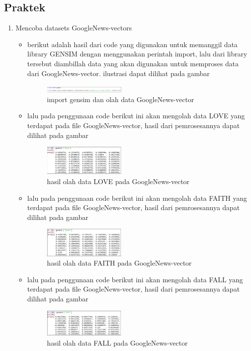 \subsection{Praktek}
\begin{enumerate}
\item Mencoba datasets GoogleNews-vectors
\begin{itemize}
\item berikut adalah hasil dari code yang digunakan untuk memanggil data library GENSIM dengan menggunakan perintah import, lalu dari library tersebut diambillah data yang akan digunakan untuk memproses data dari GoogleNews-vector. ilustrasi dapat dilihat pada gambar
\begin{figure}[H]
\includegraphics[width=4cm]{figures/1174002/chapter5/p1.png}
\centering
\caption{import gensim dan olah data GoogleNews-vector}
\end{figure}

\item lalu pada penggunaan code berikut ini akan mengolah data LOVE yang terdapat pada file GoogleNews-vector, hasil dari pemrosesannya dapat dilihat pada gambar
\begin{figure}[H]
\includegraphics[width=4cm]{figures/1174002/chapter5/p2.png}
\centering
\caption{hasil olah data LOVE pada GoogleNews-vector}
\end{figure}

\item lalu pada penggunaan code berikut ini akan mengolah data FAITH yang terdapat pada file GoogleNews-vector, hasil dari pemrosesannya dapat dilihat pada gambar
\begin{figure}[H]
\includegraphics[width=4cm]{figures/1174002/chapter5/p3.png}
\centering
\caption{hasil olah data FAITH pada GoogleNews-vector}
\end{figure}

\item lalu pada penggunaan code berikut ini akan mengolah data FALL yang terdapat pada file GoogleNews-vector, hasil dari pemrosesannya dapat dilihat pada gambar
\begin{figure}[H]
\includegraphics[width=4cm]{figures/1174002/chapter5/p4.png}
\centering
\caption{hasil olah data FALL pada GoogleNews-vector}
\end{figure}


\end{itemize}
\end{enumerate}
